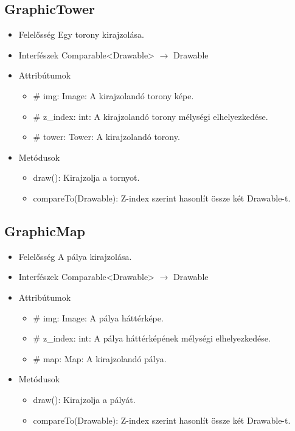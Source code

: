 \subsection{GraphicTower}
\begin{itemize}
\item Felelősség\newline
Egy torony kirajzolása.
\item Interfészek\newline
Comparable<Drawable> $\rightarrow$ Drawable
\item Attribútumok\newline
	\begin{itemize}
		\item \# img: Image: A kirajzolandó torony képe.
		\item \# z\_index: int: A kirajzolandó torony mélységi elhelyezkedése.
		\item \# tower: Tower: A kirajzolandó torony.
	\end{itemize}
\item Metódusok\newline
	\begin{itemize}
		\item draw(): Kirajzolja a tornyot.
		\item compareTo(Drawable): Z-index szerint hasonlít össze két Drawable-t.
	\end{itemize}
\end{itemize}

\subsection{GraphicMap}
\begin{itemize}
\item Felelősség\newline
A pálya kirajzolása.
\item Interfészek\newline
Comparable<Drawable> $\rightarrow$ Drawable
\item Attribútumok\newline
	\begin{itemize}
		\item \# img: Image: A pálya háttérképe.
		\item \# z\_index: int: A pálya háttérképének mélységi elhelyezkedése.
		\item \# map: Map: A kirajzolandó pálya.
	\end{itemize}
\item Metódusok\newline
	\begin{itemize}
		\item draw(): Kirajzolja a pályát.
		\item compareTo(Drawable): Z-index szerint hasonlít össze két Drawable-t.
	\end{itemize}
\end{itemize}

